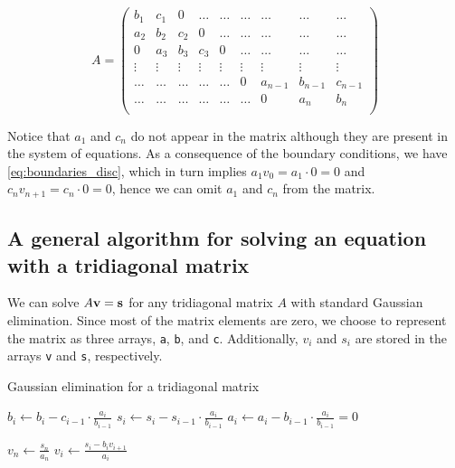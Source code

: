 \documentclass[a4paper]{article}
\begin{document}
\begin{equation}
     A = \left(\begin{array}{ccccccccc}
                   b_1 & c_1 & 0 &\dots   & \dots &\dots & \dots &\dots&\dots\\
                   a_2 & b_2 & c_2 & 0 &\dots &\dots & \dots&\dots&\dots \\
                   0 & a_3 & b_3 & c_3 & 0 & \dots & \dots&\dots&\dots \\
                   \vdots&\vdots&\vdots&\vdots&\vdots&\vdots&\vdots&\vdots&\vdots \\
                   \dots&\dots&\dots&\dots&\dots & 0 & a_{n-1}  &b_{n-1}& c_{n-1} \\
                   \dots&\dots&\dots&\dots&\dots&\dots &  0 &a_n & b_n \\
              \end{array} \right)
\end{equation}

Notice that $a_1$ and $c_{n}$ do not appear in the matrix although they are present in the system of equations. As a consequence of the boundary conditions, we have \eqref{eq:boundaries_disc}, which in turn implies $a_1 v_{0} = a_1 \cdot 0 = 0$ and $c_n v_{n+1} = c_n \cdot 0 = 0$, hence we can omit $a_1$ and $c_{n}$ from the matrix.



\subsection{A general algorithm for solving an equation with a tridiagonal matrix}\label{subsec:gen_alg}
We can solve $A {\bf v} = {\bf s}$ for any tridiagonal matrix $A$ with standard Gaussian elimination. Since most of the matrix elements are zero, we choose to represent the matrix as three arrays, \texttt{a}, \texttt{b}, and \texttt{c}. Additionally, $v_{i}$ and $s_i$ are stored in the arrays \texttt{v} and \texttt{s}, respectively.

\begin{algorithm}
\caption{Gaussian elimination for a tridiagonal matrix} \label{alg:gaussian-general-tridiagonal}
\begin{algorithmic}[1]
   
    \State $b_i \gets b_i - c_{i-1}\cdot \frac{a_i}{b_{i-1}}$ 
    \State $s_i \gets s_i - s_{i-1}\cdot \frac{a_i}{b_{i-1}}$ 
    \State $a_i \gets a_i - b_{i-1}\cdot \frac{a_i}{b_{i-1}} = 0$  \label{alg_line:update_a}
  \EndFor

  \Statex {}
  \State $v_n \gets \frac{s_n}{a_n}$
    \State $v_i \gets \frac{s_i - b_i v_{i+1}}{a_i}$
  \EndFor
\end{algorithmic}
\end{algorithm}
\end{document}

